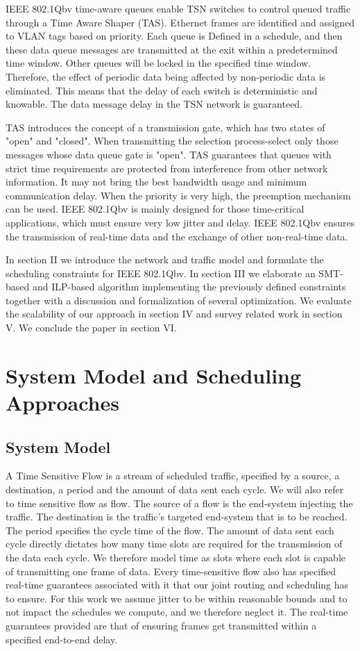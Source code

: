 \documentclass[conference]{IEEEtran}
\begin{document}
IEEE 802.1Qbv time-aware queues enable TSN switches to control queued traffic through a Time Aware Shaper (TAS). Ethernet frames are identified and assigned to VLAN tags based on priority. Each queue is Defined in a schedule, and then these data queue messages are transmitted at the exit within a predetermined time window. Other queues will be locked in the specified time window. Therefore, the effect of periodic data being affected by non-periodic data is eliminated. This means that the delay of each switch is deterministic and knowable. The data message delay in the TSN network is guaranteed.

TAS introduces the concept of a transmission gate, which has two states of "open" and "closed". When transmitting the selection process-select only those messages whose data queue gate is "open". TAS guarantees that queues with strict time requirements are protected from interference from other network information. It may not bring the best bandwidth usage and minimum communication delay. When the priority is very high, the preemption mechanism can be used. IEEE 802.1Qbv is mainly designed for those time-critical applications, which must ensure very low jitter and delay. IEEE 802.1Qbv ensures the transmission of real-time data and the exchange of other non-real-time data.

In section II we introduce the network and traffic model and formulate the scheduling constraints for IEEE 802.1Qbv. In section III we elaborate an SMT-based and ILP-based algorithm implementing the previously defined constraints together with a discussion and formalization of several optimization. We evaluate the scalability of our approach in section IV and survey related work in section V. We conclude the paper in section VI.

\section{System Model and Scheduling Approaches}
\subsection{System Model}

A Time Sensitive Flow is a stream of scheduled traffic, specified by a source, a destination, a period and the amount of data sent each cycle. We will also refer to time sensitive flow as flow. The source of a flow is the end-system injecting the traffic. The destination is the traffic’s targeted end-system that is to be reached. The period specifies the cycle time of the flow. The amount of data sent each cycle directly dictates how many time slots are required for the transmission of the data each cycle. We therefore model time as slots where each slot is capable of transmitting one frame of data. Every time-sensitive flow also has specified real-time guarantees associated with it that our joint routing and scheduling has to ensure. For this work we assume jitter to be within reasonable bounds and to not impact the schedules we compute, and we therefore neglect it. The real-time guarantees provided are that of ensuring frames get transmitted within a specified end-to-end delay.
\end{document}
